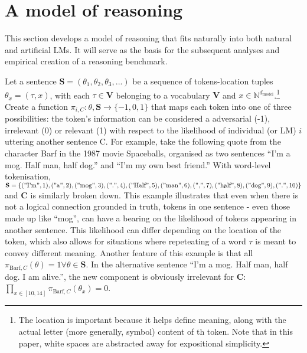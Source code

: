 \documentclass[
]{article}
\begin{document}
\section{A model of reasoning}\label{a-model-of-reasoning}

This section develops a model of reasoning that fits naturally into both
natural and artificial LMs. It will serve as the basis for the
subsequent analyses and empirical creation of a reasoning benchmark.

Let a sentence \(\mathbf{S} = (\theta_1, \theta_2, \theta_3, ...)\) be a
sequence of tokens-location tuples \(\theta_x = (\tau, x)\), with each
\(\tau \in \mathbf{V}\) belonging to a vocabulary \(\mathbf{V}\) and
\(x \in \mathbb{N}^{d_{\text{model}}}\).\footnote{The location is
  important because it helps define meaning, along with the actual
  letter (more generally, symbol) content of th token. Note that in this
  paper, white spaces are abstracted away for expositional simplicity.}
Create a function \(\pi_{i, C} : \theta, \mathbf{S} \to \{-1, 0, 1\}\)
that maps each token into one of three possibilities: the token's
information can be considered a adversarial (-1), irrelevant (0) or
relevant (1) with respect to the likelihood of individual (or LM) \(i\)
uttering another sentence C. For example, take the following quote from
the character Barf in the 1987 movie Spaceballs, organised as two
sentences ``I'm a mog. Half man, half dog.'' and ``I'm my own best
friend.'' With word-level tokenisation,
\(\mathbf{S} = \{("\text{I'm}", 1), ("\text{a}", 2), ("\text{mog}", 3), ("\text{.}", 4), ("\text{Half}", 5), ("\text{man}", 6), ("\text{,}", 7), ("\text{half}", 8), ("\text{dog}", 9), ("\text{.}", 10)\}\)
and \(\mathbf{C}\) is similarly broken down. This example illustrates
that even when there is not a logical connection grounded in truth,
tokens in one sentence - even those made up like ``mog'', can have a
bearing on the likelihood of tokens appearing in another sentence. This
likelihood can differ depending on the location of the token, which also
allows for situations where repeteating of a word \(\tau\) is meant to
convey different meaning. Another feature of this example is that all
\(\pi_{\text{Barf}, C}(\theta) = 1 \forall \theta \in \mathbf{S}\). In
the alternative sentence ``I'm a mog. Half man, half dog. I am alive.'',
the new component is obviously irrelevant for \(\mathbf{C}\):
\(\prod_{x \in [10, 14]} \pi_{\text{Barf}, C}(\theta_x) = 0\).
\end{document}

